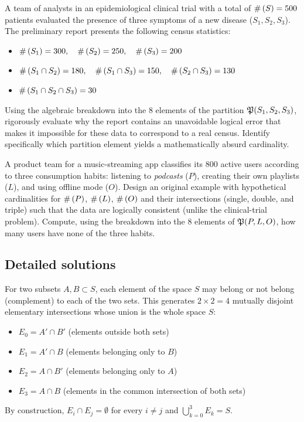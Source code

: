 \begin{problema}
	\label{prob:15ead08}
	A team of analysts in an epidemiological clinical trial with a total of $\#\left( S \right) = 500$ patients evaluated the presence of three symptoms of a new disease ($S_1, S_2, S_3$). The preliminary report presents the following census statistics:
	\begin{itemize}
		\item $\#\left( S_1 \right) = 300, \quad \#\left( S_2 \right) = 250, \quad \#\left( S_3 \right) = 200$
		\item $\#\left( S_1 \cap S_2 \right) = 180, \quad \#\left( S_1 \cap S_3 \right) = 150, \quad \#\left( S_2 \cap S_3 \right) = 130$
		\item $\#\left( S_1 \cap S_2 \cap S_3 \right) = 30$
	\end{itemize}
	Using the algebraic breakdown into the 8 elements of the partition $\mathfrak{P}(S_1,S_2,S_3)$, rigorously evaluate why the report contains an unavoidable logical error that makes it impossible for these data to correspond to a real census. Identify specifically which partition element yields a mathematically absurd cardinality.
\end{problema}

\begin{problema}
	\label{prob:95d5458}
	A product team for a music-streaming app classifies its 800 active users according to three consumption habits: listening to \emph{podcasts} ($P$), creating their own playlists ($L$), and using offline mode ($O$). Design an original example with hypothetical cardinalities for $\#\left( P \right)$, $\#\left( L \right)$, $\#\left( O \right)$ and their intersections (single, double, and triple) such that the data are logically consistent (unlike the clinical-trial problem). Compute, using the breakdown into the 8 elements of $\mathfrak{P}(P,L,O)$, how many users have none of the three habits.
\end{problema}

\subsection*{Detailed solutions}

\begin{solproblema}[prob:b94325d]
	For two subsets $A, B \subset S$, each element of the space $S$ may belong or not belong (complement) to each of the two sets. This generates $2 \times 2 = 4$ mutually disjoint elementary intersections whose union is the whole space $S$:
	\begin{itemize}
		\item $E_0 = A' \cap B'$ (elements outside both sets)
		\item $E_1 = A' \cap B$ (elements belonging only to $B$)
		\item $E_2 = A \cap B'$ (elements belonging only to $A$)
		\item $E_3 = A \cap B$ (elements in the common intersection of both sets)
	\end{itemize}
	By construction, $E_i \cap E_j = \emptyset$ for every $i \neq j$ and $\bigcup_{k=0}^3 E_k = S$.
\end{solproblema}

